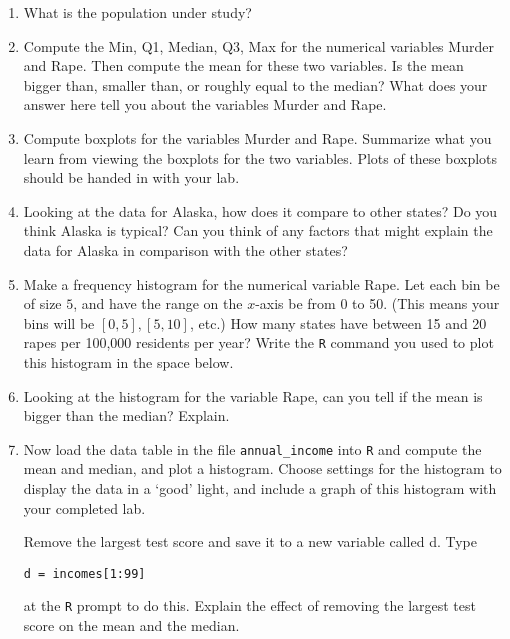 \documentclass{report}
\begin{document}
\begin{enumerate}

\item What is the population under study?


\item Compute the Min, Q1, Median, Q3, Max for the numerical variables
Murder and Rape.  Then compute the mean for these two variables.  Is
the mean bigger than, smaller than, or roughly equal to the median?
What does your answer here tell you about the variables Murder and
Rape.


\item Compute boxplots for the variables Murder and Rape.  Summarize what
you learn from viewing the boxplots for the two variables.  Plots of these boxplots
should be handed in with your lab.


\item Looking at the data for Alaska, how does it compare to other states?
Do you think Alaska is typical?  Can you think of any factors that
might explain the data for Alaska in comparison with the other
states?


\item Make a frequency histogram for the numerical variable Rape.  Let each
bin be of size $5$, and have the range on the $x$-axis be from 0 to
50.  (This means your bins will be $[0,5], [5,10]$, etc.)  How many
states have between 15 and 20 rapes per 100,000 residents per year?
Write the {\tt R} command you used to plot this histogram in the space
below.

      
\item Looking at the histogram for the variable Rape, can you tell if
the mean is bigger than the median?  Explain.


\item Now load the data table in the file {\tt annual\_income} into
{\tt R} and compute the mean and median, and plot a histogram. 
Choose settings for the histogram to display the data in a `good'
light, and include a graph of this histogram with your completed
lab. 

Remove the largest test score and save it to a new variable called d.  Type

\hskip 1cm {\tt d = incomes[1:99]}

at the {\tt R} prompt to do this.  Explain the effect of removing the
largest test score on the mean and the median.

\end{enumerate}
 
\end{document}
